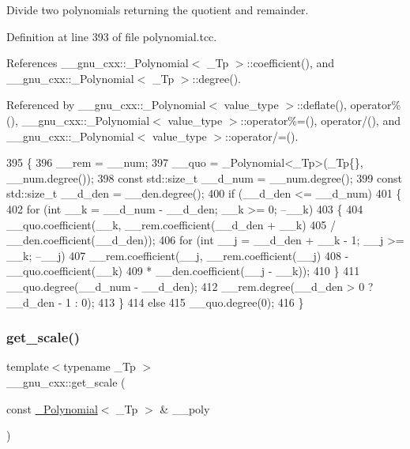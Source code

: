Divide two polynomials returning the quotient and remainder. 

Definition at line 393 of file polynomial.\+tcc.



References \+\_\+\+\_\+gnu\+\_\+cxx\+::\+\_\+\+Polynomial$<$ \+\_\+\+Tp $>$\+::coefficient(), and \+\_\+\+\_\+gnu\+\_\+cxx\+::\+\_\+\+Polynomial$<$ \+\_\+\+Tp $>$\+::degree().



Referenced by \+\_\+\+\_\+gnu\+\_\+cxx\+::\+\_\+\+Polynomial$<$ value\+\_\+type $>$\+::deflate(), operator\%(), \+\_\+\+\_\+gnu\+\_\+cxx\+::\+\_\+\+Polynomial$<$ value\+\_\+type $>$\+::operator\%=(), operator/(), and \+\_\+\+\_\+gnu\+\_\+cxx\+::\+\_\+\+Polynomial$<$ value\+\_\+type $>$\+::operator/=().


\begin{DoxyCode}
395     \{
396       \_\_rem = \_\_num;
397       \_\_quo = \_Polynomial<\_Tp>(\_Tp\{\}, \_\_num.degree());
398       \textcolor{keyword}{const} std::size\_t \_\_d\_num = \_\_num.degree();
399       \textcolor{keyword}{const} std::size\_t \_\_d\_den = \_\_den.degree();
400       \textcolor{keywordflow}{if} (\_\_d\_den <= \_\_d\_num)
401         \{
402           \textcolor{keywordflow}{for} (\textcolor{keywordtype}{int} \_\_k = \_\_d\_num - \_\_d\_den; \_\_k >= 0; --\_\_k)
403             \{
404               \_\_quo.coefficient(\_\_k, \_\_rem.coefficient(\_\_d\_den + \_\_k)
405                                    / \_\_den.coefficient(\_\_d\_den));
406               \textcolor{keywordflow}{for} (\textcolor{keywordtype}{int} \_\_j = \_\_d\_den + \_\_k - 1; \_\_j >= \_\_k; --\_\_j)
407                 \_\_rem.coefficient(\_\_j, \_\_rem.coefficient(\_\_j)
408                                      - \_\_quo.coefficient(\_\_k)
409                                      * \_\_den.coefficient(\_\_j - \_\_k));
410             \}
411           \_\_quo.degree(\_\_d\_num - \_\_d\_den);
412           \_\_rem.degree(\_\_d\_den > 0 ? \_\_d\_den - 1 : 0);
413         \}
414       \textcolor{keywordflow}{else}
415         \_\_quo.degree(0);
416     \}
\end{DoxyCode}
\mbox{\label{namespace____gnu__cxx_a2af747c0e255f3fae4d9f118c2817e1a}} 
\subsubsection{\texorpdfstring{get\+\_\+scale()}{get\_scale()}\hspace{0.1cm}{\footnotesize\ttfamily [1/2]}}
{\footnotesize\ttfamily template$<$typename \+\_\+\+Tp $>$ \\
\+\_\+\+\_\+gnu\+\_\+cxx\+::get\+\_\+scale (\begin{DoxyParamCaption}\item[{const \hyperlink{class____gnu__cxx_1_1__Polynomial}{\+\_\+\+Polynomial}$<$ \+\_\+\+Tp $>$ \&}]{\+\_\+\+\_\+poly }\end{DoxyParamCaption})}

